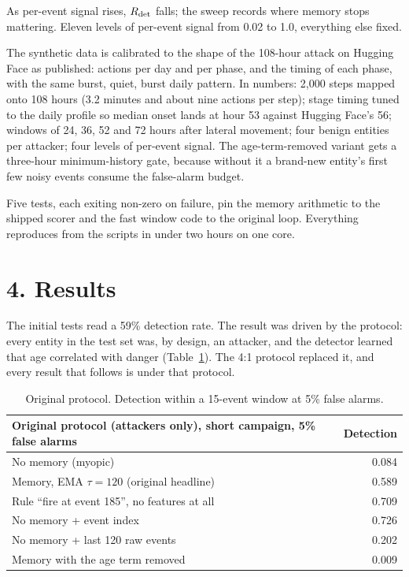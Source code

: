 \documentclass[11pt,letterpaper]{article}
\begin{document}
As per-event signal rises, $R_{\rm det}$ falls; the sweep records where memory stops mattering. Eleven levels of per-event signal from 0.02 to 1.0, everything else fixed.

The synthetic data is calibrated to the shape of the 108-hour attack on Hugging Face as published: actions per day and per phase, and the timing of each phase, with the same burst, quiet, burst daily pattern. In numbers: 2,000 steps mapped onto 108 hours (3.2 minutes and about nine actions per step); stage timing tuned to the daily profile so median onset lands at hour 53 against Hugging Face's 56; windows of 24, 36, 52 and 72 hours after lateral movement; four benign entities per attacker; four levels of per-event signal. The age-term-removed variant gets a three-hour minimum-history gate, because without it a brand-new entity's first few noisy events consume the false-alarm budget.

Five tests, each exiting non-zero on failure, pin the memory arithmetic to the shipped scorer and the fast window code to the original loop. Everything reproduces from the scripts in under two hours on one core.

\section*{4. Results}
The initial tests read a 59\% detection rate. The result was driven by the protocol: every entity in the test set was, by design, an attacker, and the detector learned that age correlated with danger (Table~\ref{tab:locked}). The 4:1 protocol replaced it, and every result that follows is under that protocol.

\begin{table}[H]\centering\small
\begin{tabular}{lr}
\toprule
Original protocol (attackers only), short campaign, 5\% false alarms & Detection \\
\midrule
No memory (myopic) & 0.084 \\
Memory, EMA $\tau=120$ (original headline) & 0.589 \\
Rule ``fire at event 185'', no features at all & 0.709 \\
No memory + event index & 0.726 \\
No memory + last 120 raw events & 0.202 \\
Memory with the age term removed & 0.009 \\
\bottomrule
\end{tabular}
\caption{Original protocol. Detection within a 15-event window at 5\% false alarms.}\label{tab:locked}
\end{table}
\end{document}
